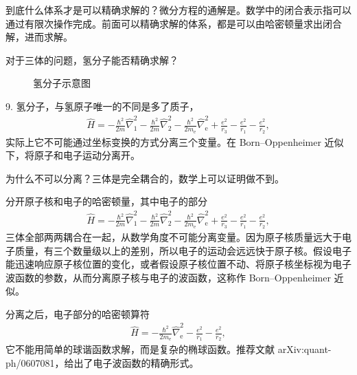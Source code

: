 到底什么体系才是可以精确求解的？微分方程的通解是。数学中的闭合表示指可以通过有限次操作完成。前面可以精确求解的体系，都是可以由哈密顿量求出闭合解，进而求解。

对于三体的问题，氢分子能否精确求解？
\begin{figure}[tp]\centering
    \caption{氢分子示意图}
    \end{figure}

9. 氢分子，与氢原子唯一的不同是多了质子，
\begin{align}
    \hat H = - \frac{\hbar^2}{2m} \hat \nabla_1^2 - \frac{\hbar^2}{2m} \hat\nabla_2^2 - \frac{\hbar^2}{2m_\mathrm{e}} \hat \nabla_{\mathrm e}^2 + \frac{e^2}{r_3} - \frac{e^2}{r_1} - \frac{e^2}{r_2},
\end{align}
实际上它不可能通过坐标变换的方式分离三个变量。在 Born--Oppenheimer 近似下，将原子和电子运动分离开。

为什么不可以分离？三体是完全耦合的，数学上可以证明做不到。

分开原子核和电子的哈密顿量，其中电子的部分
\begin{align}
    \hat H = - \frac{\hbar^2}{2m} \hat\nabla_1^2 - \frac{\hbar^2}{2m} \hat\nabla_2^2 - \frac{\hbar^2}{2m_\mathrm{e}} \hat\nabla_{\mathrm{e}}^2 + \frac{e^2}{r_3} - \frac{e^2}{r_1} - \frac{e^2}{r_2},
\end{align}
三体全部两两耦合在一起，从数学角度不可能分离变量。因为原子核质量远大于电子质量，有三个数量级以上的差别，所以电子的运动会远远快于原子核。假设电子能迅速响应原子核位置的变化，或者假设原子核位置不动、将原子核坐标视为电子波函数的参数，从而分离原子核与电子的波函数，这称作 Born--Oppenheimer 近似。

分离之后，电子部分的哈密顿算符
\begin{align}
    \hat H = - \frac{\hbar^2}{2m_{\mathrm e}} \hat \nabla_\mathrm{e}^2 - \frac{e^2}{r_1} - \frac{e^2}{r_2},
\end{align}
它不能用简单的球谐函数求解，而是复杂的椭球函数。推荐文献 arXiv:quant-ph/0607081，给出了电子波函数的精确形式。

